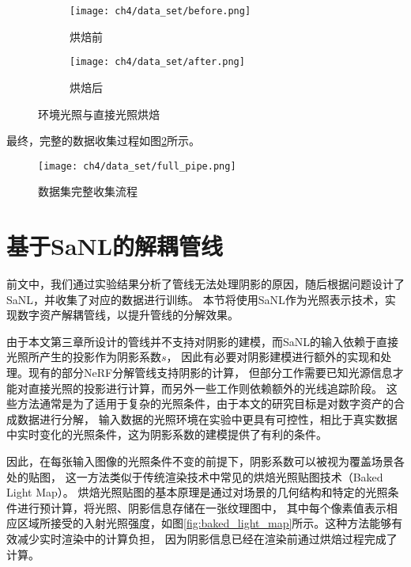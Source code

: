\begin{figure}[H]
  \centering
  \begin{subfigure}[t]{0.45\textwidth}
    \centering
    \texttt{[image: ch4/data\_set/before.png]}
    \caption{烘焙前}
  \end{subfigure}
  \begin{subfigure}[t]{0.45\textwidth}
    \centering
    \texttt{[image: ch4/data\_set/after.png]}
    \caption{烘焙后}
  \end{subfigure}
  \caption{环境光照与直接光照烘焙}
  \label{fig:light_baking}
\end{figure}

最终，完整的数据收集过程如图\ref{fig:full_pipe}所示。

\begin{figure}[htb]
  \centering
  \texttt{[image: ch4/data\_set/full\_pipe.png]}
  \caption{数据集完整收集流程}
  \label{fig:full_pipe}
\end{figure}

\section{基于SaNL的解耦管线}

前文中，我们通过实验结果分析了管线无法处理阴影的原因，随后根据问题设计了SaNL，并收集了对应的数据进行训练。
本节将使用SaNL作为光照表示技术，实现数字资产解耦管线，以提升管线的分解效果。

由于本文第三章所设计的管线并不支持对阴影的建模，而SaNL的输入依赖于直接光照所产生的投影作为阴影系数$s$，
因此有必要对阴影建模进行额外的实现和处理。现有的部分NeRF分解管线支持阴影的计算，
但部分工作需要已知光源信息才能对直接光照的投影进行计算，而另外一些工作则依赖额外的光线追踪阶段。
这些方法通常是为了适用于复杂的光照条件，由于本文的研究目标是对数字资产的合成数据进行分解，
输入数据的光照环境在实验中更具有可控性，相比于真实数据中实时变化的光照条件，这为阴影系数的建模提供了有利的条件。

因此，在每张输入图像的光照条件不变的前提下，阴影系数可以被视为覆盖场景各处的贴图，
这一方法类似于传统渲染技术中常见的烘焙光照贴图技术（Baked Light Map）。
烘焙光照贴图的基本原理是通过对场景的几何结构和特定的光照条件进行预计算，将光照、阴影信息存储在一张纹理图中，
其中每个像素值表示相应区域所接受的入射光照强度，如图\ref{fig:baked_light_map}所示。这种方法能够有效减少实时渲染中的计算负担，
因为阴影信息已经在渲染前通过烘焙过程完成了计算。

